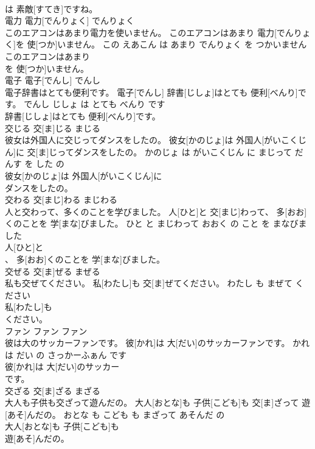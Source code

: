 \documentclass[8pt]{extreport}
\begin{document}
\begin{CJK}{UTF8}{min}
\\	は 素敵[すてき]ですね。			
\\	電力	電力[でんりょく]	でんりょく	
\\	このエアコンはあまり電力を使いません。	このエアコンはあまり 電力[でんりょく]を 使[つか]いません。	この えあこん は あまり でんりょく を つかいません	
\\	このエアコンはあまり
\\	を 使[つか]いません。			
\\	電子	電子[でんし]	でんし	
\\	電子辞書はとても便利です。	電子[でんし] 辞書[じしょ]はとても 便利[べんり]です。	でんし じしょ は とても べんり です	
\\	辞書[じしょ]はとても 便利[べんり]です。			
\\	交じる	交[ま]じる	まじる	
\\	彼女は外国人に交じってダンスをしたの。	彼女[かのじょ]は 外国人[がいこくじん]に 交[ま]じってダンスをしたの。	かのじょ は がいこくじん に まじって だんす を した の	
\\	彼女[かのじょ]は 外国人[がいこくじん]に
\\	ダンスをしたの。			
\\	交わる	交[まじ]わる	まじわる	
\\	人と交わって、多くのことを学びました。	人[ひと]と 交[まじ]わって、 多[おお]くのことを 学[まな]びました。	ひと と まじわって おおく の こと を まなびました	
\\	人[ひと]と
\\	、 多[おお]くのことを 学[まな]びました。			
\\	交ぜる	交[ま]ぜる	まぜる	
\\	私も交ぜてください。	私[わたし]も 交[ま]ぜてください。	わたし も まぜて ください	
\\	私[わたし]も
\\	ください。			
\\	ファン	ファン	ファン	
\\	彼は大のサッカーファンです。	彼[かれ]は 大[だい]のサッカーファンです。	かれ は だい の さっかーふぁん です	
\\	彼[かれ]は 大[だい]のサッカー
\\	です。			
\\	交ざる	交[ま]ざる	まざる	
\\	大人も子供も交ざって遊んだの。	大人[おとな]も 子供[こども]も 交[ま]ざって 遊[あそ]んだの。	おとな も こども も まざって あそんだ の	
\\	大人[おとな]も 子供[こども]も
\\	遊[あそ]んだの。			

\end{CJK}
\end{document}
